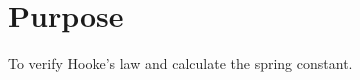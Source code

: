 \begingroup
\let\clearpage\relax\chapter{Purpose}

To verify Hooke's law and calculate the spring constant.


